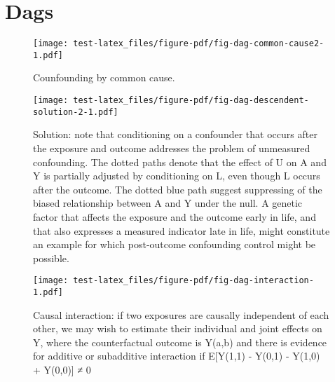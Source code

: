 \documentclass[
  singlecolumn]{report}
\begin{document}
\hypertarget{dags}{%
\section{Dags}\label{dags}}

\begin{figure}

{\centering \texttt{[image: test-latex\_files/figure-pdf/fig-dag-common-cause2-1.pdf]}

}

\caption{\label{fig-dag-common-cause2}Counfounding by common cause.}

\end{figure}

\begin{figure}

{\centering \texttt{[image: test-latex\_files/figure-pdf/fig-dag-descendent-solution-2-1.pdf]}

}

\caption{\label{fig-dag-descendent-solution-2}Solution: note that
conditioning on a confounder that occurs after the exposure and outcome
addresses the problem of unmeasured confounding. The dotted paths denote
that the effect of U on A and Y is partially adjusted by conditioning on
L, even though L occurs after the outcome. The dotted blue path suggest
suppressing of the biased relationship between A and Y under the null. A
genetic factor that affects the exposure and the outcome early in life,
and that also expresses a measured indicator late in life, might
constitute an example for which post-outcome confounding control might
be possible.}

\end{figure}

\begin{figure}

{\centering \texttt{[image: test-latex\_files/figure-pdf/fig-dag-interaction-1.pdf]}

}

\caption{\label{fig-dag-interaction}Causal interaction: if two exposures
are causally independent of each other, we may wish to estimate their
individual and joint effects on Y, where the counterfactual outcome is
Y(a,b) and there is evidence for additive or subadditive interaction if
E{[}Y(1,1) - Y(0,1) - Y(1,0) + Y(0,0){]} ≠ 0}

\end{figure}
\end{document}
